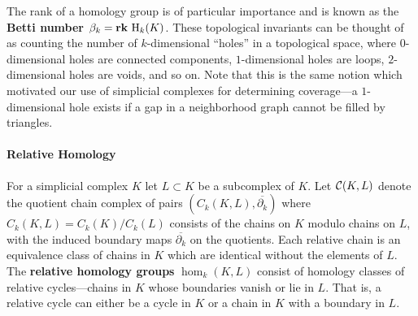 The rank of a homology group is of particular importance and is known as the \textbf{Betti number} $\beta_k = \mathbf{rk}~ \mathrm{H}_k(K)$.
These topological invariants can be thought of as counting the number of $k$-dimensional ``holes'' in a topological space, where $0$-dimensional holes are connected components, $1$-dimensional holes are loops, $2$-dimensional holes are voids, and so on.
Note that this is the same notion which motivated our use of simplicial complexes for determining coverage---a $1$-dimensional hole exists if a gap in a neighborhood graph cannot be filled by triangles.

\paragraph*{\textbf{Relative Homology}}


For a simplicial complex $K$ let $L\subset K$ be a subcomplex of $K$.
Let $\mathcal{C}(K, L)$ denote the quotient chain complex of pairs $(C_k(K, L), \overline{\partial_k})$ where $C_k(K, L) = C_k(K)/C_k(L)$ consists of the chains on $K$ modulo chains on $L$, with the induced boundary maps $\overline{\partial_k}$ on the quotients.
Each relative chain is an equivalence class of chains in $K$ which are identical without the elements of $L$.
The \textbf{relative homology groups} $\hom_k(K, L)$ consist of homology classes of relative cycles---chains in $K$ whose boundaries vanish or lie in $L$.
That is, a relative cycle can either be a cycle in $K$ or a chain in $K$ with a boundary in $L$.

